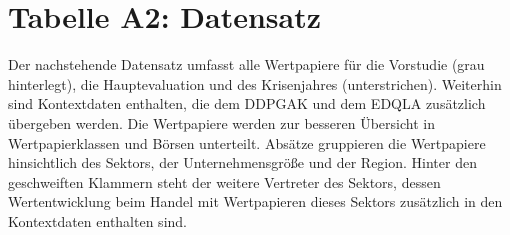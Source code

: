 \vspace{-3mm}
\section*{Tabelle A2: Datensatz}
\label{tabe2}

Der nachstehende Datensatz umfasst alle Wertpapiere für die Vorstudie (grau hinterlegt), die Hauptevaluation und des Krisenjahres (unterstrichen). Weiterhin sind Kontextdaten enthalten, die dem \acs{DDPGAK} und dem \acs{EDQLA} zusätzlich übergeben werden.
Die Wertpapiere werden zur besseren Übersicht in Wertpapierklassen und Börsen unterteilt. Absätze gruppieren die Wertpapiere hinsichtlich des Sektors, der Unternehmensgröße und der Region. Hinter den geschweiften Klammern steht der weitere Vertreter des Sektors, dessen Wertentwicklung beim Handel mit Wertpapieren dieses Sektors zusätzlich in den Kontextdaten enthalten sind.
\enlargethispage{2\baselineskip}
\vspace*{-4mm}%

